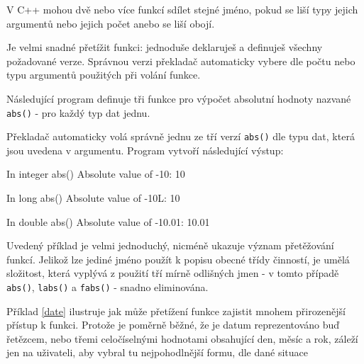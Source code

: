     V C++ mohou dvě nebo více funkcí sdílet stejné jméno, pokud se liší typy jejich argumentů nebo jejich počet anebo se liší
    obojí.

    Je velmi snadné přetížit funkci: jednoduše deklaruješ a definuješ všechny požadované verze. Správnou verzi překladač
    automaticky vybere dle počtu nebo typu argumentů použitých při volání funkce.

    \begin{example}
      Následující program definuje tři funkce pro výpočet absolutní hodnoty nazvané \lstinline[basicstyle=\ttfamily]!abs()! - pro
      každý typ dat jednu.
      
      \end{example}

      Překladač automaticky volá správně jednu ze tří verzí \lstinline[basicstyle=\ttfamily]!abs()! dle typu dat, která jsou
      uvedena v argumentu. Program vytvoří následující výstup:
      \begin{center}
      In integer abs()
      Absolute value of -10: 10

      In long abs()
      Absolute value of -10L: 10

      In double abs()
      Absolute value of -10.01: 10.01
      \end{center}

      Uvedený příklad je velmi jednoduchý, nicméně ukazuje význam přetěžování funkcí. Jelikož lze jediné jméno použít k popisu
      obecné třídy činností, je umělá složitost, která vyplývá z použití tří mírně odlišných jmen - v tomto případě
      \lstinline[basicstyle=\ttfamily]!abs()!, \lstinline[basicstyle=\ttfamily]!labs()! a
      \lstinline[basicstyle=\ttfamily]!fabs()! - snadno eliminována.

      \begin{example}\label{date}
      
      \end{example}

    Příklad \ref{date} ilustruje jak může přetížení funkce zajistit mnohem při\-rozenější přístup k funkci. Protože je poměrně
    běžné, že je datum reprezentováno buď řetězcem, nebo třemi celočíselnými hodnotami obsahující den, měsíc a rok, záleží jen na
    uživateli, aby vybral tu nejpohodlnější formu, dle dané situace

